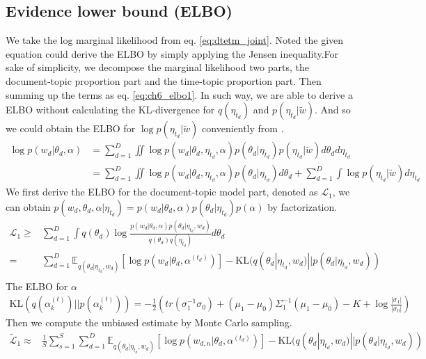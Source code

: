 \subsection{Evidence lower bound (ELBO)}
We take the log marginal likelihood from eq. \ref{eq:dtetm_joint}. Noted the given equation could derive the ELBO by simply applying the Jensen inequality.For sake of simplicity, we decompose the marginal likelihood two parts, the document-topic proportion part and the time-topic proportion part. Then summing up the terms as eq. \ref{eq:ch6_elbo1}. In such way, we are able to derive a ELBO without calculating the KL-divergence for $ q(\eta_{t_d}) $ and $ p(\eta_{t_d}|\tilde{w}) $. And so we could obtain the ELBO for $ \log p(\eta_{t_d}|\tilde{w}) $ conveniently from \cite{titsias_bayesian_nodate}.
\begin{align}\label{eq:ch6_elbo1}
\log p(w_d|\theta_d,\alpha)&=\sum_{d=1}^{D}\iint\log p(w_d|\theta_d,\eta_{t_d},\alpha)p(\theta_d|\eta_{t_d})p(\eta_{t_d}|\tilde{w})d\theta_{d}d\eta_{t_d}\\
&=\sum_{d=1}^{D}\iint\log p(w_d|\theta_d,\eta_{t_d},\alpha)p(\theta_d|\eta_{t_d})d\theta_{d}+\sum_{d=1}^{D}\int\log p(\eta_{t_d}|\tilde{w})d\eta_{t_d}
\end{align}
We first derive the ELBO for the document-topic model part, denoted as $ \mathcal{L}_{1} $, we can obtain $ p(w_d,\theta_d,\alpha|\eta_{t_d})=p(w_d|\theta_d,\alpha)p(\theta_{d}|\eta_{t_d})p(\alpha)$ by factorization. 
\begin{align*}
\mathcal{L}_{1}\geq&\sum_{d=1}^{D}\int q(\theta_d)\log\frac{p(w_d|\theta_{d},\alpha)p(\theta_d|\eta_{t_d},w_d)}{q(\theta_d)q(\eta_{t_d})}d\theta_d\\
=&\sum_{d=1}^{D}\mathbb{E}_{ q(\theta_d|\eta_{t_d},w_d)}[\log p(w_{d}|\theta_d,\alpha^{(t_d)})]-\text{KL}(q(\theta_d|\eta_{t_d},w_d)||p(\theta_d|\eta_{t_d},w_d))\\
\end{align*}
The ELBO for $ \alpha $
\begin{align*}
\text{KL}(q(\alpha_k^{(t)})||p(\alpha_k^{(t)}))=-\frac{1}{2}\left(tr(\sigma_1^{-1}\sigma_0)+(\mu_1-\mu_0)\Sigma_1^{-1}(\mu_1-\mu_0)-K+\log\frac{|\sigma_1|}{|\sigma_0|}\right)
\end{align*}
Then we compute the unbiased estimate by Monte Carlo sampling.
\begin{align*}
\tilde{\mathcal{L}}_{1}\approx&\frac{1}{S}\sum_{s=1}^{S}\sum_{d=1}^{D}\mathbb{E}_{ q(\theta_d|\eta_{t_d},w_d)}[\log p(w_{d,n}|\theta_d,\alpha^{(t_d)})]-\text{KL}(q(\theta_d|\eta_{t_d},w_d)||p(\theta_d|\eta_{t_d},w_d))\\
\end{align*}
